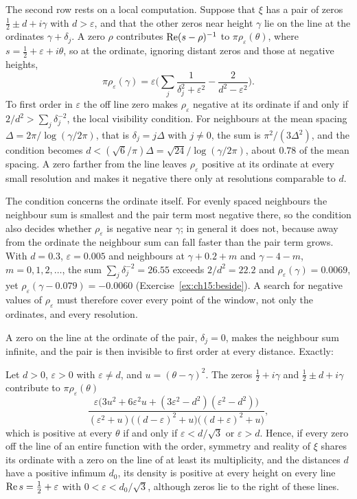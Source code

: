 The second row rests on a local computation. Suppose that $\xi$ has a pair of zeros $\frac12\pm d+i\gamma$ with $d>\varepsilon$, and that the other zeros near height $\gamma$ lie on the line at the ordinates $\gamma+\delta_j$. A zero $\rho$ contributes $\operatorname{Re}(s-\rho)^{-1}$ to $\pi\rho_\varepsilon(\theta)$, where $s=\frac12+\varepsilon+i\theta$, so at the ordinate, ignoring distant zeros and those at negative heights,
\[
\pi\rho_\varepsilon(\gamma)=\varepsilon\Big(\sum_j\frac1{\delta_j^2+\varepsilon^2}-\frac2{d^2-\varepsilon^2}\Big).
\]
To first order in $\varepsilon$ the off line zero makes $\rho_\varepsilon$ negative at its ordinate if and only if $2/d^2>\sum_j\delta_j^{-2}$, the local visibility condition. For neighbours at the mean spacing $\Delta=2\pi/\log(\gamma/2\pi)$, that is $\delta_j=j\Delta$ with $j\ne0$, the sum is $\pi^2/(3\Delta^2)$, and the condition becomes $d<(\sqrt6/\pi)\Delta=\sqrt{24}/\log(\gamma/2\pi)$, about $0.78$ of the mean spacing. A zero farther from the line leaves $\rho_\varepsilon$ positive at its ordinate at every small resolution and makes it negative there only at resolutions comparable to $d$.

The condition concerns the ordinate itself. For evenly spaced neighbours the neighbour sum is smallest and the pair term most negative there, so the condition also decides whether $\rho_\varepsilon$ is negative near $\gamma$; in general it does not, because away from the ordinate the neighbour sum can fall faster than the pair term grows. With $d=0.3$, $\varepsilon=0.005$ and neighbours at $\gamma+0.2+m$ and $\gamma-4-m$, $m=0,1,2,\dots$, the sum $\sum_j\delta_j^{-2}=26.55$ exceeds $2/d^2=22.2$ and $\rho_\varepsilon(\gamma)=0.0069$, yet $\rho_\varepsilon(\gamma-0.079)=-0.0060$ (Exercise~\ref{ex:ch15:beside}). A search for negative values of $\rho_\varepsilon$ must therefore cover every point of the window, not only the ordinates, and every resolution.

A zero on the line at the ordinate of the pair, $\delta_j=0$, makes the neighbour sum infinite, and the pair is then invisible to first order at every distance. Exactly:

\begin{proposition}\label{tx4:prop:triple}
Let $d>0$, $\varepsilon>0$ with $\varepsilon\ne d$, and $u=(\theta-\gamma)^2$. The zeros $\frac12+i\gamma$ and $\frac12\pm d+i\gamma$ contribute to $\pi\rho_\varepsilon(\theta)$
\[
\frac{\varepsilon\big(3u^2+6\varepsilon^2u+(3\varepsilon^2-d^2)(\varepsilon^2-d^2)\big)}{(\varepsilon^2+u)\big((d-\varepsilon)^2+u\big)\big((d+\varepsilon)^2+u\big)},
\]
which is positive at every $\theta$ if and only if $\varepsilon<d/\sqrt3$ or $\varepsilon>d$. Hence, if every zero off the line of an entire function with the order, symmetry and reality of $\xi$ shares its ordinate with a zero on the line of at least its multiplicity, and the distances $d$ have a positive infimum $d_0$, its density is positive at every height on every line $\operatorname{Re} s=\frac12+\varepsilon$ with $0<\varepsilon<d_0/\sqrt3$, although zeros lie to the right of these lines.
\end{proposition}


